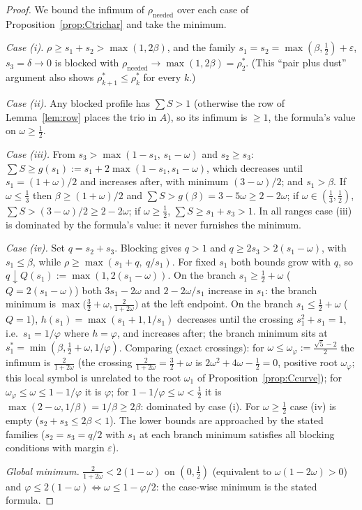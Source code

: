 \documentclass[11pt]{article}
\theoremstyle{definition}
\begin{document}
\begin{proof}
We bound the infimum of $\rho_{\mathrm{needed}}$ over each case of
Proposition~\ref{prop:Ctrichar} and take the minimum.

\emph{Case (i).} $\rho\ge s_1+s_2>\max(1,2\beta)$, and the family
$s_1=s_2=\max(\beta,\tfrac12)+\varepsilon$, $s_3=\delta\to0$ is blocked
with $\rho_{\mathrm{needed}}\to\max(1,2\beta)=\rho^*_2$. (This ``pair plus
dust'' argument also shows $\rho^*_{k+1}\le\rho^*_k$ for every $k$.)

\emph{Case (ii).} Any blocked profile has $\sum S>1$ (otherwise the row of
Lemma~\ref{lem:row} places the trio in $A$), so its infimum is $\ge1$,
the formula's value on $\omega\ge\tfrac12$.

\emph{Case (iii).} From $s_3>\max(1-s_1,\,s_1-\omega)$ and $s_2\ge s_3$:
$\sum S\ge g(s_1):=s_1+2\max(1-s_1,s_1-\omega)$, which decreases until
$s_1=(1+\omega)/2$ and increases after, with minimum $(3-\omega)/2$; and
$s_1>\beta$. If $\omega\le\tfrac13$ then $\beta\ge(1+\omega)/2$ and
$\sum S>g(\beta)=3-5\omega\ge2-2\omega$; if $\omega\in(\tfrac13,\tfrac12)$,
$\sum S>(3-\omega)/2\ge2-2\omega$; if $\omega\ge\tfrac12$,
$\sum S\ge s_1+s_3>1$. In all ranges case (iii) is dominated by the
formula's value: it never furnishes the minimum.

\emph{Case (iv).} Set $q=s_2+s_3$. Blocking gives $q>1$ and
$q\ge2s_3>2(s_1-\omega)$, with $s_1\le\beta$, while
$\rho\ge\max(s_1+q,\ q/s_1)$. For fixed $s_1$ both bounds grow with $q$, so
$q\downarrow Q(s_1):=\max(1,2(s_1-\omega))$. On the branch
$s_1\ge\tfrac12+\omega$ ($Q=2(s_1-\omega)$) both
$3s_1-2\omega$ and $2-2\omega/s_1$ increase in $s_1$: the branch minimum is
$\max\bigl(\tfrac32+\omega,\tfrac{2}{1+2\omega}\bigr)$ at the left endpoint.
On the branch $s_1\le\tfrac12+\omega$ ($Q=1$),
$h(s_1)=\max(s_1+1,1/s_1)$ decreases until the crossing $s_1^2+s_1=1$,
i.e.\ $s_1=1/\varphi$ where $h=\varphi$, and increases after; the branch
minimum sits at $s_1^*=\min(\beta,\tfrac12+\omega,1/\varphi)$. Comparing
(exact crossings): for $\omega\le\omega_\varphi:=\tfrac{\sqrt5-2}{2}$ the infimum
is $\tfrac{2}{1+2\omega}$ (the crossing
$\tfrac{2}{1+2\omega}=\tfrac32+\omega$ is $2\omega^2+4\omega-\tfrac12=0$,
positive root $\omega_\varphi$; this local symbol is unrelated to the root
$\omega_1$ of Proposition~\ref{prop:Ccurve}); for
$\omega_\varphi\le\omega\le1-1/\varphi$ it is $\varphi$; for
$1-1/\varphi\le\omega<\tfrac12$ it is
$\max(2-\omega,1/\beta)=1/\beta\ge2\beta$: dominated by case (i). For
$\omega\ge\tfrac12$ case (iv) is empty ($s_2+s_3\le2\beta<1$). The lower
bounds are approached by the stated families ($s_2=s_3=q/2$ with $s_1$ at
each branch minimum satisfies all blocking conditions with margin
$\varepsilon$).

\emph{Global minimum.} $\tfrac{2}{1+2\omega}<2(1-\omega)$ on
$(0,\tfrac12)$ (equivalent to $\omega(1-2\omega)>0$) and
$\varphi\le2(1-\omega)\iff\omega\le1-\varphi/2$: the case-wise minimum is
the stated formula.
\end{proof}
\end{document}
